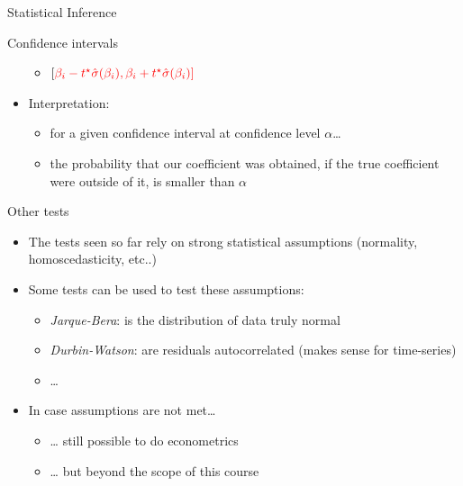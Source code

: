 \documentclass[
  ignorenonframetext,
  aspectratio=169,
]{beamer}
\providecommand{\tightlist}{%
  \setlength{\itemsep}{0pt}\setlength{\parskip}{0pt}}\usepackage{longtable,booktabs,array}
\begin{document}
\begin{frame}{Statistical Inference}
\begin{block}{Confidence intervals}
\begin{itemize}
  \begin{itemize}
  \tightlist
  \item
    \([\color{red}{\beta_i} - t^{\star} \color{red}{\hat{\sigma}(\beta_i)}, \color{red}{\beta_i} + t^{\star} \color{red}{\hat{\sigma}(\beta_i)}]\)
  \end{itemize}
\item
  Interpretation:

  \begin{itemize}
  \tightlist
  \item
    for a given confidence interval at confidence level
    \(\alpha\)\ldots{}
  \item
    the probability that our coefficient was obtained, if the true
    coefficient were outside of it, is smaller than \(\alpha\)
  \end{itemize}
\end{itemize}
\end{block}

\begin{block}{Other tests}
\protect\hypertarget{other-tests}{}
\begin{itemize}
\tightlist
\item
  The tests seen so far rely on strong statistical assumptions
  (normality, homoscedasticity, etc..)
\item
  Some tests can be used to test these assumptions:

  \begin{itemize}
  \tightlist
  \item
    \emph{Jarque-Bera}: is the distribution of data truly normal
  \item
    \emph{Durbin-Watson}: are residuals autocorrelated (makes sense for
    time-series)
  \item
    \ldots{}
  \end{itemize}
\item
  In case assumptions are not met\ldots{}

  \begin{itemize}
  \tightlist
  \item
    \ldots{} still possible to do econometrics
  \item
    \ldots{} but beyond the scope of this course
  \end{itemize}
\end{itemize}
\end{block}
\end{frame}
\end{document}
